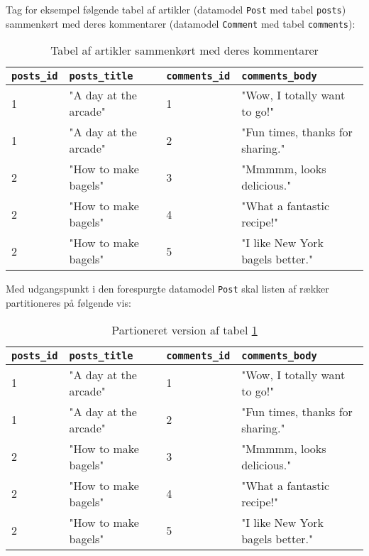 Tag for eksempel følgende tabel af artikler (datamodel \texttt{Post} med tabel \texttt{posts}) sammenkørt med deres kommentarer (datamodel \texttt{Comment} med tabel \texttt{comments}):

\begin{table}[h]
  \centering
  \begin{tabular}{l | l | l | l}

    \hline

    \texttt{posts\_id} & \texttt{posts\_title} & \texttt{comments\_id} & \texttt{comments\_body} \\

    \hline

    1 & "A day at the arcade" & 1 & "Wow, I totally want to go!" \\
    1 & "A day at the arcade" & 2 & "Fun times, thanks for sharing." \\
    2 & "How to make bagels" & 3 & "Mmmmm, looks delicious." \\
    2 & "How to make bagels" & 4 & "What a fantastic recipe!" \\
    2 & "How to make bagels" & 5 & "I like New York bagels better." \\

    \hline

  \end{tabular}
  \caption{Tabel af artikler sammenkørt med deres kommentarer}
  \label{data-table:posts}
\end{table}

Med udgangspunkt i den forespurgte datamodel \texttt{Post} skal listen af rækker partitioneres på følgende vis:

\begin{table}[h]
  \centering
  \begin{tabular}{l | l | l | l}

    \hline

    \texttt{posts\_id} & \texttt{posts\_title} & \texttt{comments\_id} & \texttt{comments\_body} \\

    \hline\hline

    1 & "A day at the arcade" & 1 & "Wow, I totally want to go!" \\
    1 & "A day at the arcade" & 2 & "Fun times, thanks for sharing." \\

    \hline\hline

    2 & "How to make bagels" & 3 & "Mmmmm, looks delicious." \\
    2 & "How to make bagels" & 4 & "What a fantastic recipe!" \\
    2 & "How to make bagels" & 5 & "I like New York bagels better." \\

    \hline

  \end{tabular}
  \caption{Partioneret version af tabel \ref{data-table:posts}}
  \label{data-table:posts-partition}
\end{table}

